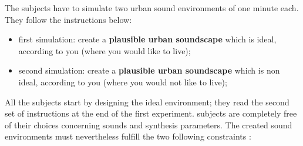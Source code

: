 \documentclass[12pt]{elsarticle}
\begin{document}

The subjects have to simulate two urban sound environments of one minute each. They follow the instructions below:


\begin{itemize}
\item  first simulation: create a \textbf{plausible urban soundscape} which is ideal, according to you (where you would like to live);
\item second simulation: create a \textbf{plausible urban soundscape} which is non ideal, according to you (where you would not like to live);
\end{itemize}



All the subjects start by designing the ideal environment; they read the second set of instructions at the end of the first experiment. subjects are completely free of their choices concerning sounds and synthesis parameters. The created sound environments must nevertheless fulfill the two following constraints :

\end{document}

